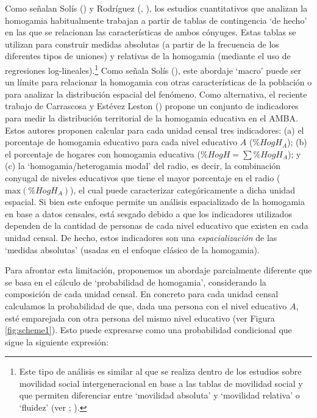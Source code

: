\documentclass[
  spanish,
  a4paper,%
  chapterprefix=true,%
  DIV=calc,%
  twoside]{scrbook}%
\begin{document}
Como señalan Solís () y Rodríguez (, ),
los estudios cuantitativos que analizan la homogamia habitualmente
trabajan a partir de tablas de contingencia `de hecho' en las que se
relacionan las características de ambos cónyuges. Estas tablas se
utilizan para construir medidas absolutas (a partir de la frecuencia de
los diferentes tipos de uniones) y relativas de la homogamia (mediante
el uso de regresiones log-lineales).\footnote{Este tipo de análisis es similar al que se
  realiza dentro de los estudios sobre movilidad social
  intergeneracional en base a las tablas de movilidad social y que
  permiten diferenciar entre `movilidad absoluta' y `movilidad
  relativa' o `fluidez' (ver ; ).} Como
señala Solís (), este abordaje `macro' puede ser un límite
para relacionar la homogamia con otras características de la población o
para analizar la distribución espacial del fenómeno. Como alternativa,
el reciente trabajo de Carrascosa y Estévez Leston () propone un conjunto de
indicadores para medir la distribución territorial de la homogamia
educativa en el AMBA. Estos autores proponen calcular para cada unidad
censal tres indicadores: (a) el porcentaje de homogamia educativo para
cada nivel educativo \(A\) (\(\%HogH_A\)); (b) el porcentaje de hogares con
homogamia educativa (\(\%HogH = \sum \%HogH_A\)); y (c) la
`homogamia/heterogamia modal' del radio, es decir, la combinación
conyugal de niveles educativos que tiene el mayor porcentaje en el radio
(\(\text{max}\left(\%HogH_A\right)\)), el cual puede caracterizar
categóricamente a dicha unidad espacial. Si bien este enfoque permite un
análisis espacializado de la homogamia en base a datos censales, está
sesgado debido a que los indicadores utilizados dependen de la cantidad
de personas de cada nivel educativo que existen en cada unidad censal.
De hecho, estos indicadores son una \emph{espacialización} de las `medidas
absolutas' (usadas en el enfoque clásico de la homogamia).

Para afrontar esta limitación, proponemos un abordaje parcialmente
diferente que se basa en el cálculo de `probabilidad de homogamia',
considerando la composición de cada unidad censal. En concreto para cada
unidad censal calculamos la probabilidad de que, dada una persona con el
nivel educativo \(A\), esté emparejada con otra persona del mismo nivel
educativo (ver Figura \ref{fig:scheme1}). Esto puede expresarse como
una probabilidad condicional que sigue la siguiente expresión:
\end{document}
